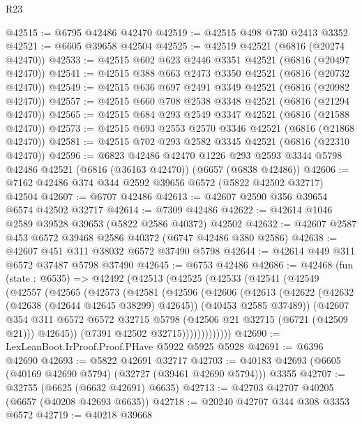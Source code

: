 \begin{lexlean}{R23}
\begin{coremodule}
@42515 := @6795 @42486 @42470
@42519 := @42515 @498 @730 @2413 @3352
@42521 := @6605 @39658 @42504
@42525 := @42519 @42521 (@6816 (@20274 @42470))
@42533 := @42515 @602 @623 @2446 @3351 @42521 (@6816 (@20497 @42470))
@42541 := @42515 @388 @663 @2473 @3350 @42521 (@6816 (@20732 @42470))
@42549 := @42515 @636 @697 @2491 @3349 @42521 (@6816 (@20982 @42470))
@42557 := @42515 @660 @708 @2538 @3348 @42521 (@6816 (@21294 @42470))
@42565 := @42515 @684 @293 @2549 @3347 @42521 (@6816 (@21588 @42470))
@42573 := @42515 @693 @2553 @2570 @3346 @42521 (@6816 (@21868 @42470))
@42581 := @42515 @702 @293 @2582 @3345 @42521 (@6816 (@22310 @42470))
@42596 := @6823
    @42486
    @42470
    @1226
    @293
    @2593
    @3344
    @5798
    @42486
    @42521
    (@6816 (@36163 @42470))
    (@6657 (@6838 @42486))
@42606 := @7162 @42486 @374 @344 @2592 @39656 @6572 (@5822 @42502 @32717) @42504
@42607 := @6707 @42486
@42613 := @42607 @2590 @356 @39654 @6574 @42502 @32717
@42614 := @7309 @42486
@42622 := @42614 @1046 @2589 @39528 @39653 (@5822 @2586 @40372) @42502
@42632 := @42607 @2587 @453 @6572 @39468 @2586 @40372 (@6747 @42486 @380 @2586)
@42638 := @42607 @451 @311 @38032 @6572 @37490 @5798
@42644 := @42614 @449 @311 @6572 @37487 @5798 @37490
@42645 := @6753 @42486
@42686 := @42468
    (fun (state : @6535) =>
    @42492
      (@42513
        (@42525
          (@42533
            (@42541
              (@42549
                (@42557
                  (@42565
                    (@42573
                      (@42581
                        (@42596
                          (@42606
                            (@42613
                              (@42622
                                (@42632 (@42638 (@42644 @42645 @38299) @42645))
                                (@40453 @2585 @37489))
                              (@42607
                                @354
                                @311
                                @6572
                                @6572
                                @32715
                                @5798
                                (@42506 @21 @32715 (@6721 (@42509 @21)))
                                @42645))
                            (@7391 @42502 @32715)))))))))))))
@42690 := LexLeanBoot.IrProof.Proof.PHave @5922 @5925 @5928
@42691 := @6396 @42690
@42693 := @5822 @42691 @32717
@42703 := @40183 @42693 (@6605 (@40169 @42690 @5794) (@32727 (@39461 @42690 @5794))) @3355
@42707 := @32755 (@6625 (@6632 @42691) @6635)
@42713 := @42703 @42707 @40205 (@6657 (@40208 @42693 @6635))
@42718 := @20240 @42707 @344 @308 @3353 @6572
@42719 := @40218 @39668

\end{coremodule}
\end{lexlean}
